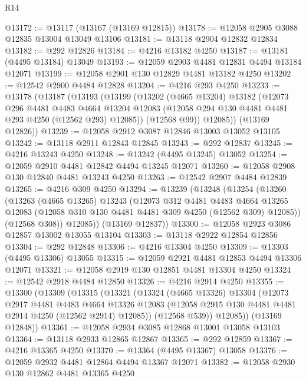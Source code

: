 \begin{lexlean}{R14}
\begin{coremodule}
@13172 := @13117 (@13167 (@13169 @12815))
@13178 := @12058 @2905 @3088 @12835 @13004 @13049 @13106
@13181 := @13118 @2904 @12832 @12834
@13182 := @292 @12826
@13184 := @4216 @13182 @4250
@13187 := @13181 (@4495 @13184) @13049
@13193 := @12059 @2903 @4481 @12831 @4494 @13184 @12071
@13199 := @12058 @2901 @130 @12829 @4481 @13182 @4250
@13202 := @12542 @2900 @4484 @12828
@13204 := @4216 @293 @4250
@13233 := @13178
    (@13187
      (@13193
        (@13199
          (@13202
            (@4665 @13204)
            @13182
            (@12073
              @296
              @4481
              @4483
              @4664
              @13204
              @12083
              (@12058 @294 @130 @4481 @4481 @293 @4250 (@12562 @293) @12085))
            (@12568 @99))
          @12085))
      (@13169 @12826))
@13239 := @12058 @2912 @3087 @12846 @13003 @13052 @13105
@13242 := @13118 @2911 @12843 @12845
@13243 := @292 @12837
@13245 := @4216 @13243 @4250
@13248 := @13242 (@4495 @13245) @13052
@13254 := @12059 @2910 @4481 @12842 @4494 @13245 @12071
@13260 := @12058 @2908 @130 @12840 @4481 @13243 @4250
@13263 := @12542 @2907 @4484 @12839
@13265 := @4216 @309 @4250
@13294 := @13239
    (@13248
      (@13254
        (@13260
          (@13263
            (@4665 @13265)
            @13243
            (@12073
              @312
              @4481
              @4483
              @4664
              @13265
              @12083
              (@12058 @310 @130 @4481 @4481 @309 @4250 (@12562 @309) @12085))
            (@12568 @308))
          @12085))
      (@13169 @12837))
@13300 := @12058 @2923 @3086 @12857 @13002 @13055 @13104
@13303 := @13118 @2922 @12854 @12856
@13304 := @292 @12848
@13306 := @4216 @13304 @4250
@13309 := @13303 (@4495 @13306) @13055
@13315 := @12059 @2921 @4481 @12853 @4494 @13306 @12071
@13321 := @12058 @2919 @130 @12851 @4481 @13304 @4250
@13324 := @12542 @2918 @4484 @12850
@13326 := @4216 @2914 @4250
@13355 := @13300
    (@13309
      (@13315
        (@13321
          (@13324
            (@4665 @13326)
            @13304
            (@12073
              @2917
              @4481
              @4483
              @4664
              @13326
              @12083
              (@12058 @2915 @130 @4481 @4481 @2914 @4250 (@12562 @2914) @12085))
            (@12568 @539))
          @12085))
      (@13169 @12848))
@13361 := @12058 @2934 @3085 @12868 @13001 @13058 @13103
@13364 := @13118 @2933 @12865 @12867
@13365 := @292 @12859
@13367 := @4216 @13365 @4250
@13370 := @13364 (@4495 @13367) @13058
@13376 := @12059 @2932 @4481 @12864 @4494 @13367 @12071
@13382 := @12058 @2930 @130 @12862 @4481 @13365 @4250

\end{coremodule}
\end{lexlean}
